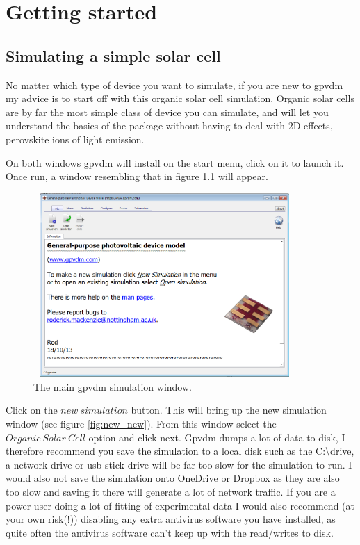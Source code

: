 \chapter{Getting started}
\section{Simulating a simple solar cell}
No matter which type of device you want to simulate, if you are new to gpvdm my advice is to start off with this organic solar cell simulation. Organic solar cells are by far the most simple class of device you can simulate, and will let you understand the basics of the package without having to deal with 2D effects, perovskite ions of light emission. 

On both windows gpvdm will install on the start menu, click on it to launch it.  Once run, a window resembling that in figure \ref{fig:new_open} will appear.  

\begin{figure}[H]
\centering
\includegraphics[width=100mm,height=70mm]{./images/new_open.png}
\caption{The main gpvdm simulation window.}
\label{fig:new_open}
\end{figure}

Click on the $new~simulation$ button.  This will bring up the new simulation window (see figure \ref{fig:new_new}).  From this window select the $Organic~Solar~Cell$ option and click next.  Gpvdm dumps a lot of data to disk, I therefore recommend you save the simulation to a local disk such as the C:\textbackslash drive, a network drive or usb stick drive will be far too slow for the simulation to run.  I would also not save the simulation onto OneDrive or Dropbox as they are also too slow and saving it there will generate a lot of network traffic.  If you are a power user doing a lot of fitting of experimental data I would also recommend (at your own risk(!)) disabling any extra antivirus software you have installed, as quite often the antivirus software can't keep up with the read/writes to disk.

